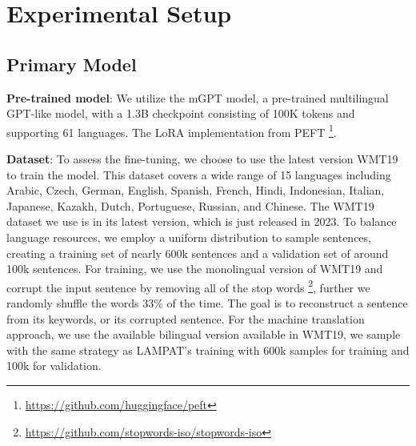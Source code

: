 \documentclass[letterpaper]{article} %
\begin{document}
\section{Experimental Setup}
\subsection{Primary Model}

\textbf{Pre-trained model}: We utilize the mGPT model, a pre-trained multilingual GPT-like model, with a 1.3B checkpoint consisting of 100K tokens and supporting 61 languages. The LoRA implementation from PEFT \footnote{\url{https://github.com/huggingface/peft}}. %

\textbf{Dataset}: To assess the fine-tuning, we choose to use the latest version WMT19 \citep{wmt19translate} to train the model. This dataset covers a wide range of 15 languages including Arabic, Czech, German, English, Spanish, French, Hindi, Indonesian, Italian, Japanese, Kazakh, Dutch, Portuguese, Russian, and Chinese. The WMT19 dataset we use is in its latest version, which is just released in 2023. To balance language resources, we employ a uniform distribution to sample sentences, creating a training set of nearly 600k sentences and a validation set of around 100k sentences. For training, we use the monolingual version of WMT19 and corrupt the input sentence by removing all of the stop words \footnote{\url{https://github.com/stopwords-iso/stopwords-iso}}, further we randomly shuffle the words 33\% of the time. The goal is to reconstruct a sentence from its keywords, or its corrupted sentence. For the machine translation approach, we use the available bilingual version available in WMT19, we sample with the same strategy as LAMPAT's training with 600k samples for training and 100k for validation.

\end{document}
